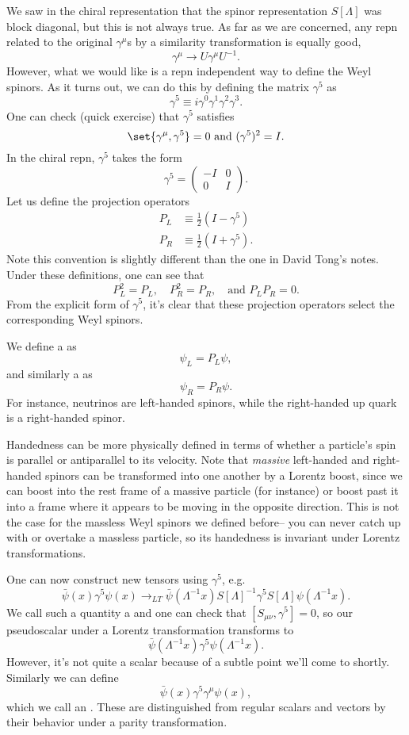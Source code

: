 We saw in the chiral representation that the spinor representation $S[\Lambda]$ was block diagonal, but this is not always true. As far as we are concerned, any repn related to the original $\gamma^\mu$s by a similarity transformation is equally good,
$$\gamma^\mu\to U\gamma^\mu U^{-1}.$$
However, what we would like is a repn independent way to define the Weyl spinors. As it turns out, we can do this by defining the matrix $\gamma^5$ as
$$\gamma^5 \equiv i \gamma^0 \gamma^1 \gamma^2 \gamma^3.$$
One can check (quick exercise) that $\gamma^5$ satisfies
$$\set{\gamma^\mu,\gamma^5}=0\text{ and }(\gamma^5)^2=I.$$
In the chiral repn, $\gamma^5$ takes the form
$$\gamma^5=\begin{pmatrix}
-I&0\\0&I
\end{pmatrix}.$$
Let us define the projection operators
\begin{align*}
    P_L & \equiv \frac{1}{2}(I-\gamma^5)\\
    P_R & \equiv \frac{1}{2}(I+\gamma^5).
\end{align*}
Note this convention is slightly different than the one in David Tong's notes. Under these definitions, one can see that
$$P_L^2=P_L,\quad P_R^2=P_R,\quad \text{and } P_LP_R =0.$$
From the explicit form of $\gamma^5$, it's clear that these projection operators select the corresponding Weyl spinors.
\begin{defn}
We define a  as
$$\psi_L=P_L \psi,$$
and similarly a  as
$$\psi_R=P_R \psi.$$
For instance, neutrinos are left-handed spinors, while the right-handed up quark is a right-handed spinor.

Handedness can be more physically defined in terms of whether a particle's spin is parallel or antiparallel to its velocity. Note that \emph{massive} left-handed and right-handed spinors can be transformed into one another by a Lorentz boost, since we can boost into the rest frame of a massive particle (for instance) or boost past it into a frame where it appears to be moving in the opposite direction. This is not the case for the massless Weyl spinors we defined before-- you can never catch up with or overtake a massless particle, so its handedness is invariant under Lorentz transformations.
\end{defn}
One can now construct new tensors using $\gamma^5$, e.g.
$$\bar \psi(x) \gamma^5 \psi(x)\to_{LT} \bar \psi(\Lambda^{-1}x)S[\Lambda]^{-1}\gamma^5 S[\Lambda] \psi(\Lambda^{-1}x).$$
We call such a quantity a  and one can check that $[S_{\mu\nu},\gamma^5]=0$, so our pseudoscalar under a Lorentz transformation transforms to 
$$\bar\psi(\Lambda^{-1}x)\gamma^5 \psi(\Lambda^{-1}x).$$
However, it's not quite a scalar because of a subtle point we'll come to shortly. Similarly we can define
$$\bar \psi(x) \gamma^5 \gamma^\mu \psi(x),$$
which we call an . These are distinguished from regular scalars and vectors by their behavior under a parity transformation.

